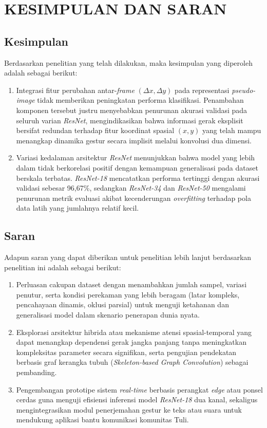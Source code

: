 \newpage
\chapter{KESIMPULAN DAN SARAN} \label{Bab V}

\section{Kesimpulan} \label{V.Kesimpulan}
Berdasarkan penelitian yang telah dilakukan, maka kesimpulan yang diperoleh adalah sebagai berikut:
\begin{enumerate}
    \item Integrasi fitur perubahan antar-\textit{frame} $(\Delta x, \Delta y)$ pada representasi \textit{pseudo-image} tidak memberikan peningkatan performa klasifikasi. 
    Penambahan komponen tersebut justru menyebabkan penurunan akurasi validasi pada seluruh varian \textit{ResNet}, mengindikasikan bahwa informasi gerak eksplisit bersifat redundan terhadap fitur koordinat spasial $(x, y)$ yang telah mampu menangkap dinamika gestur secara implisit melalui konvolusi dua dimensi.
    \item Variasi kedalaman arsitektur \textit{ResNet} menunjukkan bahwa model yang lebih dalam tidak berkorelasi positif dengan kemampuan generalisasi pada dataset berskala terbatas. 
    \textit{ResNet-18} mencatatkan performa tertinggi dengan akurasi validasi sebesar 96,67\%, sedangkan \textit{ResNet-34} dan \textit{ResNet-50} mengalami penurunan metrik evaluasi akibat kecenderungan \textit{overfitting} terhadap pola data latih yang jumlahnya relatif kecil.
\end{enumerate}

\section{Saran} \label{V.Saran}
Adapun saran yang dapat diberikan untuk penelitian lebih lanjut berdasarkan penelitian ini adalah sebagai berikut:\par
\begin{enumerate}
    \item Perluasan cakupan dataset dengan menambahkan jumlah sampel, variasi penutur, serta kondisi perekaman yang lebih beragam (latar kompleks, pencahayaan dinamis, oklusi parsial) untuk menguji ketahanan dan generalisasi model dalam skenario penerapan dunia nyata.
    \item Eksplorasi arsitektur hibrida atau mekanisme atensi spasial-temporal yang dapat menangkap dependensi gerak jangka panjang tanpa meningkatkan kompleksitas parameter secara signifikan, serta pengujian pendekatan berbasis graf kerangka tubuh (\textit{Skeleton-based Graph Convolution}) sebagai pembanding.
    \item Pengembangan prototipe sistem \textit{real-time} berbasis perangkat \textit{edge} atau ponsel cerdas guna menguji efisiensi inferensi model \textit{ResNet-18} dua kanal, sekaligus mengintegrasikan modul penerjemahan gestur ke teks atau suara untuk mendukung aplikasi bantu komunikasi komunitas Tuli.
\end{enumerate}
